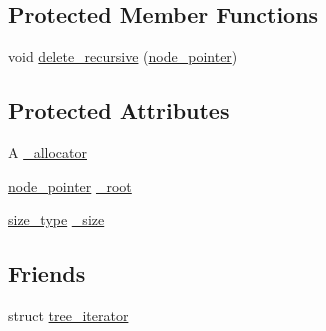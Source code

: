 \subsection*{Protected Member Functions}
\begin{DoxyCompactItemize}
\item 
void \hyperlink{classcrap_1_1binary__tree_a7d2bf1043055e08d3e4dba56ce7c03ad}{delete\-\_\-recursive} (\hyperlink{classcrap_1_1binary__tree_a04d7ea4aa1c1cc5bdd06cbdf3d537076}{node\-\_\-pointer})
\end{DoxyCompactItemize}
\subsection*{Protected Attributes}
\begin{DoxyCompactItemize}
\item 
A \hyperlink{classcrap_1_1binary__tree_a016966b0182a79e6de3852a3c1eb9b76}{\-\_\-allocator}
\item 
\hyperlink{classcrap_1_1binary__tree_a04d7ea4aa1c1cc5bdd06cbdf3d537076}{node\-\_\-pointer} \hyperlink{classcrap_1_1binary__tree_a72a63753bc21bd96aa06897685c8fc1f}{\-\_\-root}
\item 
\hyperlink{classcrap_1_1binary__tree_a7157228ff412e3fcf54a972120b7186a}{size\-\_\-type} \hyperlink{classcrap_1_1binary__tree_a9a8c2867f018e1b57a173a3c8e411181}{\-\_\-size}
\end{DoxyCompactItemize}
\subsection*{Friends}
\begin{DoxyCompactItemize}
\item 
struct \hyperlink{classcrap_1_1binary__tree_aab327068d678315bfc662fe2fcbb247e}{tree\-\_\-iterator}
\end{DoxyCompactItemize}



